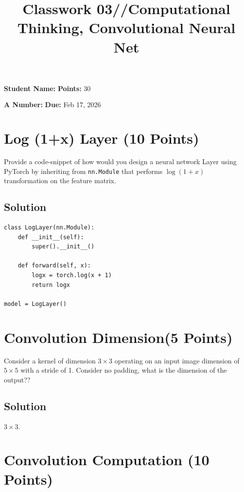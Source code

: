 \documentclass[12pt, xcolor=dvipsnames,svgnames,x11names]{article}
\makeatletter
\renewcommand{\maketitle}{%
    \vspace*{0.2cm}
    \begin{center}
        \begin{tcolorbox}[
            enhanced,
            colback=white,
            colframe=headerRed,
            arc=0mm,
            title={\textcolor{white}{\bfseries \@title}},
            coltitle=white,
            fonttitle=\bfseries\large,
            attach boxed title to top left={xshift=10pt, yshift=-\tcboxedtitleheight/2},
            boxed title style={sharp corners, colback=headerRed, frame hidden}
        ]
        \large
        \vspace{10pt}
        \noindent \textbf{Student Name:} \underline{\hspace{7cm}} \hfill \textbf{Points:} 30
        
        \vspace{10pt}
        \noindent \textbf{A Number:} \hfill \underline{\hspace{7cm}} \hfill \textbf{Due:} Feb 17, 2026
        \end{tcolorbox}
    \end{center}
    \vspace{10pt}
}
\newcommand{\hw}{Classwork 03//Computational Thinking, Convolutional Neural Net}
\makeatother
\begin{document}
\title{\hw}
\maketitle




\section{Log (1+x) Layer \hfill \textbf{(10 Points)}}

Provide a code-snippet of how would you design a neural network Layer using PyTorch by inheriting from \texttt{nn.Module} that performs $\log(1+x)$ transformation on the feature matrix.

\subsection{Solution}

          \begin{verbatim}
class LogLayer(nn.Module):
    def __init__(self):
        super().__init__()
        
    def forward(self, x):
        logx = torch.log(x + 1)
        return logx
        
model = LogLayer()
\end{verbatim}

\section{Convolution Dimension\hfill \textbf{(5 Points)}}

Consider a kernel of dimension $3\times 3$ operating on an input image dimension of $5\times 5$ with a stride of 1. Consider no padding, what is the dimension of the output??


\subsection{Solution}

$3 \times 3$.

\section{Convolution Computation \hfill \textbf{(10 Points)}}
\end{document}
